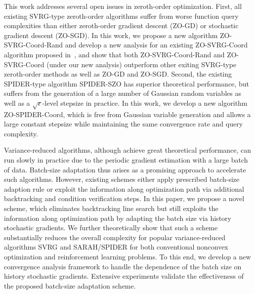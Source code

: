 \documentclass{osudissert96}
\begin{document}
 \vspace{0.2cm}
This work addresses several open issues in zeroth-order optimization. First, all existing SVRG-type zeroth-order algorithms suffer from worse function query complexities than either zeroth-order gradient descent (ZO-GD) or stochastic gradient descent (ZO-SGD). In this work, we propose a new algorithm ZO-SVRG-Coord-Rand and develop a new analysis for an existing ZO-SVRG-Coord algorithm proposed in~\cite{liu2018zeroth}, and show that both ZO-SVRG-Coord-Rand and ZO-SVRG-Coord (under our new analysis) outperform other exiting SVRG-type zeroth-order methods as well as ZO-GD and ZO-SGD. Second, the existing SPIDER-type algorithm SPIDER-SZO \cite{fang2018spider} has superior theoretical performance, but suffers from the generation of a large number of Gaussian random variables as well as a $\sqrt{\epsilon}$-level stepsize in practice. In this work, we develop a new algorithm ZO-SPIDER-Coord, which is free from Gaussian variable generation and allows a large constant stepsize while maintaining the same convergence rate and query complexity.


 \vspace{0.2cm}
Variance-reduced algorithms, although achieve great theoretical performance, can run slowly in practice due to the periodic gradient estimation with a large batch of data. Batch-size adaptation thus arises as a promising approach to accelerate such algorithms. However, existing schemes either apply prescribed batch-size adaption rule or exploit the information along optimization path via additional backtracking and condition verification steps. In this paper, we propose a novel scheme, which eliminates backtracking line search but still exploits the information along optimization path by adapting the batch size via history stochastic gradients. We further theoretically show that such a scheme substantially reduces the overall complexity for popular variance-reduced algorithms SVRG and SARAH/SPIDER for both conventional nonconvex optimization and reinforcement learning problems. To this end, we develop a new convergence analysis framework to handle the dependence of the batch size on history stochastic gradients. Extensive experiments validate the effectiveness of the proposed batch-size adaptation scheme. 
\end{document}
